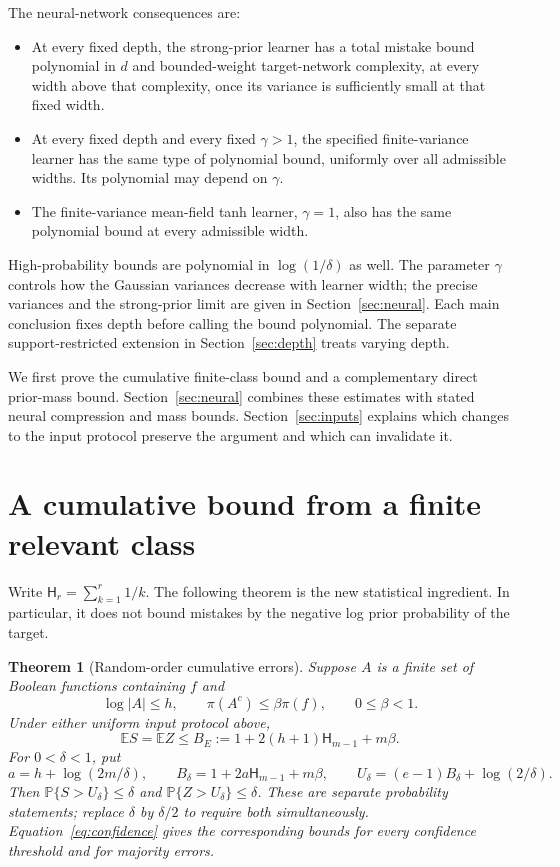 \documentclass[11pt]{article}
\newtheorem{theorem}{Theorem}
\theoremstyle{remark}\newtheorem{remark}[theorem]{Remark}
\newcommand{\E}{\mathbb E}\newcommand{\Pp}{\mathbb P}
\newcommand{\HH}{\mathsf H}
\begin{document}
The neural-network consequences are:
\begin{itemize}
\item At every fixed depth, the strong-prior learner has a total mistake
bound polynomial in $d$ and bounded-weight target-network complexity,
at every width above that complexity, once its variance is sufficiently
small at that fixed width.
\item At every fixed depth and every fixed $\gamma>1$, the specified
finite-variance learner has the same type of polynomial bound, uniformly
over all admissible widths. Its polynomial may depend on $\gamma$.
\item The finite-variance mean-field tanh learner, $\gamma=1$, also has
the same polynomial bound at every admissible width.
\end{itemize}
High-probability bounds are polynomial in $\log(1/\delta)$ as well.
The parameter $\gamma$ controls how the Gaussian variances decrease with
learner width; the precise variances and the strong-prior limit are given
in Section~\ref{sec:neural}. Each main conclusion fixes depth before
calling the bound polynomial. The separate support-restricted extension
in Section~\ref{sec:depth} treats varying depth.

We first prove the cumulative finite-class bound and a complementary
direct prior-mass bound. Section~\ref{sec:neural} combines these estimates
with stated neural compression and mass bounds.
Section~\ref{sec:inputs} explains which changes to the input protocol
preserve the argument and which can invalidate it.

\section{A cumulative bound from a finite relevant class}

Write $\HH_r=\sum_{k=1}^r1/k$. The following theorem is the new statistical
ingredient. In particular, it does not bound mistakes by the negative log
prior probability of the target.

\begin{theorem}[Random-order cumulative errors]\label{thm:finite}
Suppose $A$ is a finite set of Boolean functions containing $f$ and
\begin{equation}\label{eq:relevant}
 \log|A|\le h,\qquad \pi(A^c)\le\beta\pi(f),\qquad 0\le\beta<1.
\end{equation}
Under either uniform input protocol above,
\begin{equation}\label{eq:expectation}
 \E S=\E Z\le B_E:=1+2(h+1)\HH_{m-1}+m\beta.
\end{equation}
For $0<\delta<1$, put
\[
 a=h+\log(2m/\delta),\qquad
 B_\delta=1+2a\HH_{m-1}+m\beta,\qquad
 U_\delta=(e-1)B_\delta+\log(2/\delta).
\]
Then $\Pp\{S>U_\delta\}\le\delta$ and
$\Pp\{Z>U_\delta\}\le\delta$. These are separate probability statements;
replace $\delta$ by $\delta/2$ to require both simultaneously.
Equation~\eqref{eq:confidence} gives the corresponding bounds for every
confidence threshold and for majority errors.
\end{theorem}
\end{document}
